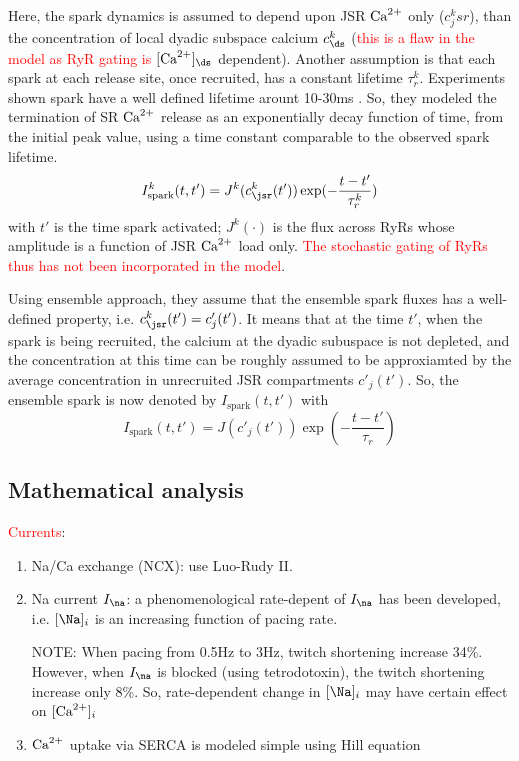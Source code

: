 Here, the spark dynamics is assumed to depend upon JSR ${\text{Ca}^{2+}}$ only ($c^k_jsr$),
than the concentration of local dyadic subspace calcium $c^k_\ds$
(\textcolor{red}{this is a flaw in the model as RyR gating is} $[\Ca]_\ds$
dependent).
Another assumption is that each spark at each release site, once recruited, has
a constant lifetime $\tau^k_r$. Experiments shown spark have a well defined
lifetime arount 10-30ms \citep{niggli1999}.
So, they modeled the termination of SR ${\text{Ca}^{2+}}$ release as an exponentially decay
function of time, from the initial peak value, using a time constant comparable
to the observed spark lifetime.
\begin{equation}
I^k_\text{spark}(t,t') = J^k(c^k_\jsr(t')) \exp(-\frac{t-t'}{\tau^k_r})
\end{equation}
with $t'$ is the time spark activated; $J^k(\cdot)$ is the flux across
RyRs whose amplitude is a function of JSR ${\text{Ca}^{2+}}$ load only. \textcolor{red}{The
stochastic gating of RyRs thus has not been incorporated in the model}.

Using ensemble approach, they assume that the ensemble spark fluxes has a
well-defined property, i.e. $c^k_\jsr(t')=c'_j(t')$. It means that at the time
$t'$, when the spark is being recruited, the calcium at the dyadic subuspace is
not depleted, and the concentration at this time can be roughly assumed to be
approxiamted by the average concentration in unrecruited JSR compartments
$c'_j(t')$. So, the ensemble spark is now denoted by $I_\text{spark}(t,t')$ with
\begin{equation}
I_\text{spark}(t,t') = J(c'_j(t')) \exp(-\frac{t-t'}{\tau_r})
\end{equation}


\subsection{Mathematical analysis}
\label{sec:shiferaw2003_math}

\textcolor{red}{Currents}:

\begin{enumerate}
  \item Na/Ca exchange (NCX): use Luo-Rudy II.
  \item Na current $I_\na$: a phenomenological rate-depent of $I_\na$ has been
  developed, i.e. $[\Na]_i$ is an increasing function of pacing rate.

  NOTE: When pacing from 0.5Hz to 3Hz, twitch shortening increase 34\%. However,
  when $I_\na$ is blocked (using tetrodotoxin), the twitch shortening increase
  only 8\%. So, rate-dependent change in $[\Na]_i$ may have certain effect on
  $[{\text{Ca}^{2+}}]_i$
  \item ${\text{Ca}^{2+}}$ uptake via SERCA is modeled simple using Hill equation
\end{enumerate}

